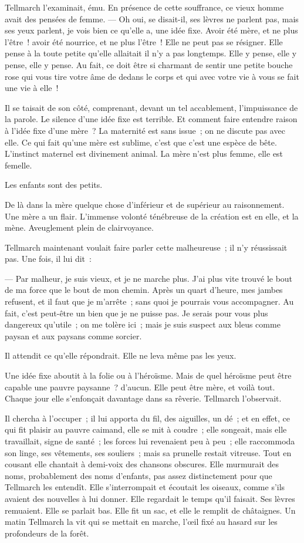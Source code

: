 \documentclass[french,twoside]{book} %
\begin{document}
Tellmarch l’examinait, ému. En présence de cette souffrance, ce vieux homme avait des pensées de femme. — Oh oui, se disait-il, ses lèvres ne parlent pas, mais ses yeux parlent, je vois bien ce qu’elle a, une idée fixe. Avoir été mère, et ne plus l’être ! avoir été nourrice, et ne plus l’être ! Elle ne peut pas se résigner. Elle pense à la toute petite qu’elle allaitait il n’y a pas longtemps. Elle y pense, elle y pense, elle y pense. Au fait, ce doit être si charmant de sentir une petite bouche rose qui vous tire votre âme de dedans le corps et qui avec votre vie à vous se fait une vie à elle !\par
Il se taisait de son côté, comprenant, devant un tel accablement, l’impuissance de la parole. Le silence d’une idée fixe est terrible. Et comment faire entendre raison à l’idée fixe d’une mère ? La maternité est sans issue ; on ne discute pas avec elle. Ce qui fait qu’une mère est sublime, c’est que c’est une espèce de bête. L’instinct maternel est divinement animal. La mère n’est plus femme, elle est femelle.\par
Les enfants sont des petits.\par
 De là dans la mère quelque chose d’inférieur et de supérieur au raisonnement. Une mère a un flair. L’immense volonté ténébreuse de la création est en elle, et la mène. Aveuglement plein de clairvoyance.\par
Tellmarch maintenant voulait faire parler cette malheureuse ; il n’y réussissait pas. Une fois, il lui dit :\par
— Par malheur, je suis vieux, et je ne marche plus. J’ai plus vite trouvé le bout de ma force que le bout de mon chemin. Après un quart d’heure, mes jambes refusent, et il faut que je m’arrête ; sans quoi je pourrais vous accompagner. Au fait, c’est peut-être un bien que je ne puisse pas. Je serais pour vous plus dangereux qu’utile ; on me tolère ici ; mais je suis suspect aux bleus comme paysan et aux paysans comme sorcier.\par
Il attendit ce qu’elle répondrait. Elle ne leva même pas les yeux.\par
Une idée fixe aboutit à la folie ou à l’héroïsme. Mais de quel héroïsme peut être capable une pauvre paysanne ? d’aucun. Elle peut être mère, et voilà tout. Chaque jour elle s’enfonçait davantage dans sa rêverie. Tellmarch l’observait.\par
Il chercha à l’occuper ; il lui apporta du fil, des aiguilles, un dé ; et en effet, ce qui fit plaisir au pauvre caimand, elle se mit à coudre ; elle songeait, mais elle travaillait, signe de santé ; les forces lui revenaient peu à peu ; elle raccommoda son linge, ses vêtements, ses souliers ; mais sa prunelle restait vitreuse. Tout en cousant elle chantait à demi-voix  des chansons obscures. Elle murmurait des noms, probablement des noms d’enfants, pas assez distinctement pour que Tellmarch les entendît. Elle s’interrompait et écoutait les oiseaux, comme s’ils avaient des nouvelles à lui donner. Elle regardait le temps qu’il faisait. Ses lèvres remuaient. Elle se parlait bas. Elle fit un sac, et elle le remplit de châtaignes. Un matin Tellmarch la vit qui se mettait en marche, l’œil fixé au hasard sur les profondeurs de la forêt.\par
\end{document}
